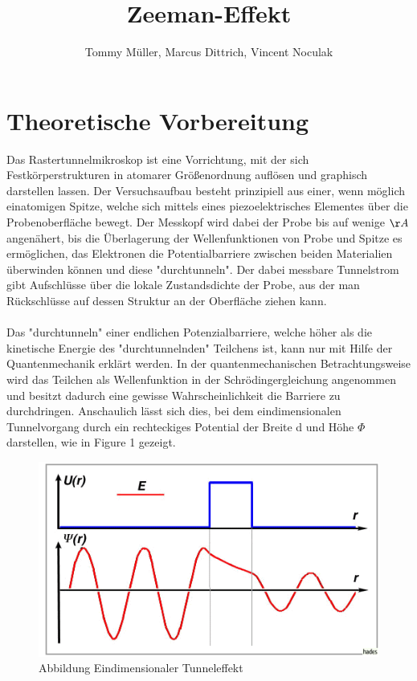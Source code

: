 \documentclass[10pt,a4paper]{article}
\author{Tommy Müller, Marcus Dittrich, Vincent Noculak}
\title{Zeeman-Effekt}
\begin{document}
\maketitle
\newpage
\newpage

\section{ Theoretische Vorbereitung}

Das Rastertunnelmikroskop ist eine Vorrichtung, mit der sich Festkörperstrukturen in atomarer Größenordnung auflösen und graphisch darstellen lassen. Der Versuchsaufbau besteht prinzipiell aus einer, wenn möglich einatomigen Spitze, welche sich mittels eines piezoelektrisches Elementes über die Probenoberfläche bewegt. Der Messkopf wird dabei der Probe bis auf wenige $\AA$ angenähert, bis die Überlagerung der Wellenfunktionen von Probe und Spitze es ermöglichen, das Elektronen die Potentialbarriere zwischen beiden Materialien überwinden können und diese "durchtunneln". Der dabei messbare Tunnelstrom gibt Aufschlüsse über die lokale Zustandsdichte der Probe, aus der man Rückschlüsse auf dessen Struktur an der Oberfläche ziehen kann. \\ \\Das "durchtunneln" einer endlichen Potenzialbarriere, welche höher als die kinetische Energie des "durchtunnelnden" Teilchens ist, kann nur mit Hilfe der Quantenmechanik erklärt werden. In der quantenmechanischen Betrachtungsweise wird das Teilchen als Wellenfunktion in der Schrödingergleichung angenommen und besitzt dadurch eine gewisse Wahrscheinlichkeit die Barriere zu durchdringen. Anschaulich lässt sich dies, bei dem eindimensionalen Tunnelvorgang durch ein rechteckiges Potential der Breite d und Höhe $\Phi$ darstellen, wie in Figure 1 gezeigt.
\begin{figure}[h]
	\includegraphics[scale = 0.8]{tunnel.png}
	\centering
	\caption{Abbildung Eindimensionaler Tunneleffekt}
	\label{diagramm_aufspaltung}
\end{figure}
\end{document}
